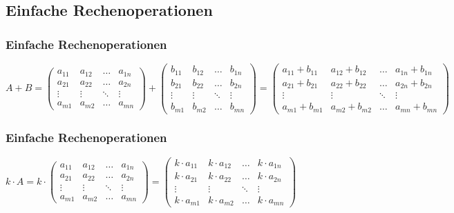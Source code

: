 \subsection{Einfache Rechenoperationen}
\begin{frame}
    \frametitle{Einfache Rechenoperationen}
    $A + B =
    \begin{pmatrix}
        a_{11} & a_{12} & \dots  & a_{1n} \\
        a_{21} & a_{22} & \dots  & a_{2n} \\
        \vdots & \vdots & \ddots & \vdots \\
        a_{m1} & a_{m2} & \dots  & a_{mn}
    \end{pmatrix}
    +
    \begin{pmatrix}
        b_{11} & b_{12} & \dots  & b_{1n} \\
        b_{21} & b_{22} & \dots  & b_{2n} \\
        \vdots & \vdots & \ddots & \vdots \\
        b_{m1} & b_{m2} & \dots  & b_{mn}
    \end{pmatrix}
    =
    \begin{pmatrix}
        a_{11} + b_{11} & a_{12} + b_{12} & \dots  & a_{1n} + b_{1n} \\
        a_{21} + b_{21} & a_{22} + b_{22} & \dots  & a_{2n} + b_{2n} \\
        \vdots          & \vdots          & \ddots & \vdots          \\
        a_{m1} + b_{m1} & a_{m2} + b_{m2} & \dots  & a_{mn} + b_{mn}
    \end{pmatrix}$
\end{frame}

\begin{frame}
    \frametitle{Einfache Rechenoperationen}
    $k \cdot A =
    k \cdot
    \begin{pmatrix}
        a_{11} & a_{12} & \dots  & a_{1n} \\
        a_{21} & a_{22} & \dots  & a_{2n} \\
        \vdots & \vdots & \ddots & \vdots \\
        a_{m1} & a_{m2} & \dots  & a_{mn}
    \end{pmatrix}
    =
    \begin{pmatrix}
        k \cdot a_{11} & k \cdot a_{12} & \dots  & k \cdot a_{1n} \\
        k \cdot a_{21} & k \cdot a_{22} & \dots  & k \cdot a_{2n} \\
        \vdots         & \vdots         & \ddots & \vdots         \\
        k \cdot a_{m1} & k \cdot a_{m2} & \dots  & k \cdot a_{mn}
    \end{pmatrix}$
\end{frame}

